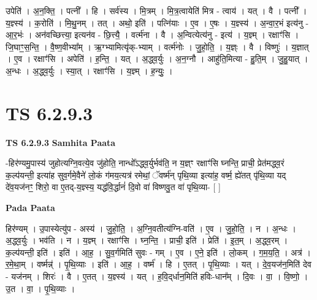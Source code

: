 \documentclass[17pt]{extarticle}
\begin{document}
उपेति॑ । अ॒न॒क्ति॒ । पत्नी᳚ । हि । सर्व॑स्य । मि॒त्रम् । मि॒त्र॒त्वायेति॑ मित्र - त्वाय॑ । यत् । वै । पत्नी᳚ । य॒ज्ञ्स्य॑ । क॒रोति॑ । मि॒थु॒नम् । तत् । अथो॒ इति॑ । पत्नि॑याः । ए॒व । ए॒षः । य॒ज्ञ्स्य॑ । अ॒न्वा॒र॒भं इत्य॑नु - आ॒र॒भंः । अन॑वच्छित्त्या॒ इत्यन॑व - छि॒त्त्यै॒ । वर्त्म॑ना । वै । अ॒न्वित्येत्य॑नु - इत्य॑ । य॒ज्ञ्म् । रक्षाꣳ॑सि । जि॒घाꣳ॒॒स॒न्ति॒ । वै॒ष्ण॒वीभ्या᳚म् । ऋ॒ग्भ्यामित्यृ॑क्-भ्याम् । वर्त्म॑नोः । जु॒हो॒ति॒ । य॒ज्ञ्ः । वै । विष्णुः॑ । य॒ज्ञात् । ए॒व । रक्षाꣳ॑सि । अपेति॑ । ह॒न्ति॒ । यत् । अ॒द्ध्व॒र्युः । अ॒न॒ग्नौ । आहु॑ति॒मित्या - हु॒ति॒म् । जु॒हु॒यात् । अ॒न्धः । अ॒द्ध्व॒र्युः । स्या॒त् । रक्षाꣳ॑सि । य॒ज्ञ्म् । ह॒न्युः॒ ।  \newline





\section{ TS 6.2.9.3 }

\textbf{TS 6.2.9.3 } \newline
\textbf{Samhita Paata} \newline

-हिर॑ण्यमु॒पास्य॑ जुहोत्यग्नि॒वत्ये॒व जु॑होति॒ नान्धो᳚ऽद्ध्व॒र्युर्भव॑ति॒ न य॒ज्ञ्ꣳ रक्षाꣳ॑सि घ्नन्ति॒ प्राची॒ प्रेत॑मद्ध्व॒रं क॒ल्प॑यन्ती॒ इत्या॑ह सुव॒र्गमे॒वैने॑ लो॒कं ग॑मय॒त्यत्र॑ रमेथां॒ ॅवर्ष्म॑न् पृथि॒व्या इत्या॑ह॒ वर्ष्म॒ ह्ये॑तत् पृ॑थि॒व्या यद् दे॑व॒यज॑नꣳ॒॒ शिरो॒ वा ए॒तद्-य॒ज्ञ्स्य॒ यद्ध॑वि॒र्द्धानं॑ दि॒वो वा॑ विष्णवु॒त वा॑ पृथि॒व्या- [  ] \newline

\textbf{Pada Paata} \newline

हिर॑ण्यम् । उ॒पास्येत्यु॑प - अस्य॑ । जु॒हो॒ति॒ । अ॒ग्नि॒वतीत्य॑ग्नि-वति॑ । ए॒व । जु॒हो॒ति॒ । न । अ॒न्धः । अ॒द्ध्व॒र्युः । भव॑ति । न । य॒ज्ञ्म् । रक्षाꣳ॑सि । घ्न॒न्ति॒ । प्राची॒ इति॑ । प्रेति॑ । इ॒त॒म् । अ॒द्ध्व॒रम् । क॒ल्प॑यन्ती॒ इति॑ । इति॑ । आ॒ह॒ । सु॒व॒र्गमिति॑ सुवः - गम् । ए॒व । ए॒ने॒ इति॑ । लो॒कम् । ग॒म॒य॒ति॒ । अत्र॑ । र॒मे॒था॒म् । वर्ष्मन्न्॑ । पृ॒थि॒व्याः । इति॑ । आ॒ह॒ । वर्ष्म॑ । हि । ए॒तत् । पृ॒थि॒व्याः । यत् । दे॒व॒यज॑न॒मिति॑ देव - यज॑नम् । शिरः॑ । वै । ए॒तत् । य॒ज्ञ्स्य॑ । यत् । ह॒वि॒द्‌र्धान॒मिति॑ हविः-धान᳚म् । दि॒वः । वा॒ । वि॒ष्णो॒ । उ॒त । वा॒ । पृ॒थि॒व्याः ।  \newline




\end{document}
